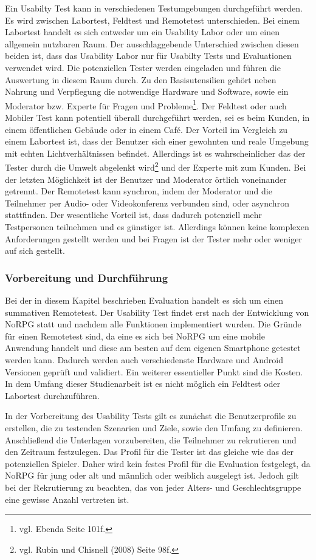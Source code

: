 			Ein Usabilty Test kann in verschiedenen Testumgebungen durchgeführt werden. Es wird zwischen Labortest, Feldtest und Remotetest unterschieden. Bei einem Labortest handelt es sich entweder um ein Usability Labor oder um einen allgemein nutzbaren Raum. Der ausschlaggebende Unterschied zwischen diesen beiden ist, dass das Usability Labor nur für Usabilty Tests und Evaluationen verwendet wird. Die potenziellen Tester werden eingeladen und führen die Auswertung in diesem Raum durch. Zu den Basisutensilien gehört neben Nahrung und Verpflegung die notwendige Hardware und Software, sowie ein Moderator bzw. Experte für Fragen und Probleme\footnote{vgl. Ebenda Seite 101f.}. Der Feldtest oder auch Mobiler Test kann potentiell überall durchgeführt werden, sei es beim Kunden, in einem öffentlichen Gebäude oder in einem Café. Der Vorteil im Vergleich zu einem Labortest ist, dass der Benutzer sich einer gewohnten und reale Umgebung mit echten Lichtverhältnissen befindet. Allerdings ist es wahrscheinlicher das der Tester durch die Umwelt abgelenkt wird\footnote{vgl. Rubin und Chisnell \cite{handbookUsability} (2008) Seite 98f.} und der Experte mit zum Kunden. Bei der letzten Möglichkeit ist der Benutzer und Moderator örtlich voneinander getrennt. Der Remotetest kann synchron, indem der Moderator und die Teilnehmer per Audio- oder Videokonferenz verbunden sind, oder asynchron stattfinden. Der wesentliche Vorteil ist, dass dadurch potenziell mehr Testpersonen teilnehmen und es günstiger ist. Allerdings können keine komplexen Anforderungen gestellt werden und bei Fragen ist der Tester mehr oder weniger auf sich gestellt.

			\subsubsection{Vorbereitung und Durchführung}
				Bei der in diesem Kapitel beschrieben Evaluation handelt es sich um einen summativen Remotetest. Der Usability Test findet erst nach der Entwicklung von NoRPG statt und nachdem alle Funktionen implementiert wurden. Die Gründe für einen Remotetest sind, da eine es sich bei NoRPG um eine mobile Anwendung handelt und diese am besten auf dem eigenen Smartphone getestet werden kann. Dadurch werden auch verschiedenste Hardware und Android Versionen geprüft und validiert. Ein weiterer essentieller Punkt sind die Kosten. In dem Umfang dieser Studienarbeit ist es nicht möglich ein Feldtest oder Labortest durchzuführen.

				In der Vorbereitung des Usability Tests gilt es zunächst die Benutzerprofile zu erstellen, die zu testenden Szenarien und Ziele, sowie den Umfang zu definieren. Anschließend die Unterlagen vorzubereiten, die Teilnehmer zu rekrutieren und den Zeitraum festzulegen. Das Profil für die Tester ist das gleiche wie das der potenziellen Spieler. Daher wird kein festes Profil für die Evaluation festgelegt, da NoRPG für jung oder alt und männlich oder weiblich ausgelegt ist. Jedoch gilt bei der Rekrutierung zu beachten, das von jeder Alters- und Geschlechtsgruppe eine gewisse Anzahl vertreten ist.

